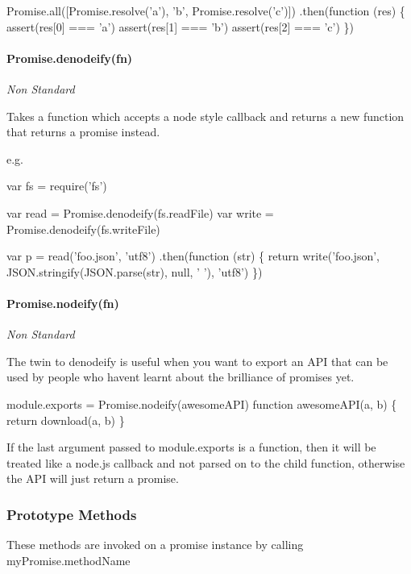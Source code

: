 \begin{DoxyCode}
Promise.all([Promise.resolve('a'), 'b', Promise.resolve('c')])
  .then(function (res) \{
    assert(res[0] === 'a')
    assert(res[1] === 'b')
    assert(res[2] === 'c')
  \})
\end{DoxyCode}


\paragraph*{Promise.\+denodeify(fn)}

{\itshape Non Standard}

Takes a function which accepts a node style callback and returns a new function that returns a promise instead.

e.\+g.


\begin{DoxyCode}
var fs = require('fs')

var read = Promise.denodeify(fs.readFile)
var write = Promise.denodeify(fs.writeFile)

var p = read('foo.json', 'utf8')
  .then(function (str) \{
    return write('foo.json', JSON.stringify(JSON.parse(str), null, '  '), 'utf8')
  \})
\end{DoxyCode}


\paragraph*{Promise.\+nodeify(fn)}

{\itshape Non Standard}

The twin to {\ttfamily denodeify} is useful when you want to export an A\+PI that can be used by people who haven\textquotesingle{}t learnt about the brilliance of promises yet.


\begin{DoxyCode}
module.exports = Promise.nodeify(awesomeAPI)
function awesomeAPI(a, b) \{
  return download(a, b)
\}
\end{DoxyCode}


If the last argument passed to {\ttfamily module.\+exports} is a function, then it will be treated like a node.\+js callback and not parsed on to the child function, otherwise the A\+PI will just return a promise.

\subsubsection*{Prototype Methods}

These methods are invoked on a promise instance by calling {\ttfamily my\+Promise.\+method\+Name}

